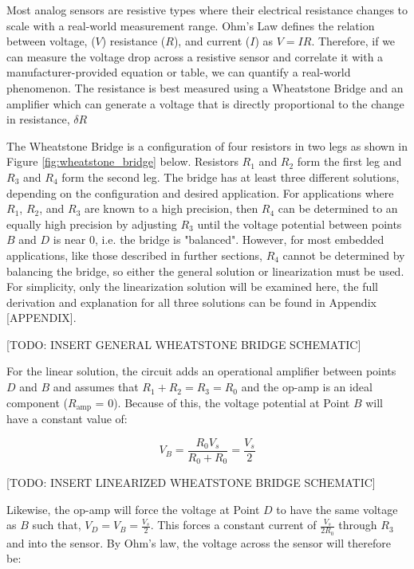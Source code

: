 Most analog sensors are resistive types where their electrical resistance changes to scale with a real-world measurement range.
Ohm's Law defines the relation between voltage, ($V$) resistance ($R$), and current ($I$) as $V=IR$.
Therefore, if we can measure the voltage drop across a resistive sensor and correlate it with a manufacturer-provided equation or table, we can quantify a real-world phenomenon.
The resistance is best measured using a Wheatstone Bridge and an amplifier which can generate a voltage that is directly proportional to the change in resistance, $\delta R$

The Wheatstone Bridge is a configuration of four resistors in two legs as shown in Figure \ref{fig:wheatstone_bridge} below.
Resistors $R_1$ and $R_2$ form the first leg and $R_3$ and $R_4$ form the second leg.
The bridge has at least three different solutions, depending on the configuration and desired application.
For applications where $R_1$, $R_2$, and $R_3$ are known to a high precision, then $R_4$ can be determined to an equally high precision by adjusting $R_3$ until the voltage potential between points $B$ and $D$ is near 0, i.e. the bridge is "balanced".
However, for most embedded applications, like those described in further sections, $R_4$ cannot be determined by balancing the bridge, so either the general solution or linearization must be used.
For simplicity, only the linearization solution will be examined here, the full derivation and explanation for all three solutions can be found in Appendix [APPENDIX].

[TODO: INSERT GENERAL WHEATSTONE BRIDGE SCHEMATIC]

For the linear solution, the circuit adds an operational amplifier between points $D$ and $B$ and assumes that $R_1+R_2=R_3=R_0$ and the op-amp is an ideal component ($R_{\text{amp}}$ = 0).
Because of this, the voltage potential at Point $B$ will have a constant value of:

\begin{equation*}
    V_B = \frac{R_0 V_s}{R_0 + R_0} = \frac{V_s}{2}
\end{equation*}

[TODO: INSERT LINEARIZED WHEATSTONE BRIDGE SCHEMATIC]

Likewise, the op-amp will force the voltage at Point $D$ to have the same voltage as $B$ such that, $V_D = V_B = \frac{V_s}{2} $.
This forces a constant current of $\frac{V_s}{2R_0} $ through $R_3$ and into the sensor.
By Ohm's law, the voltage across the sensor will therefore be:

